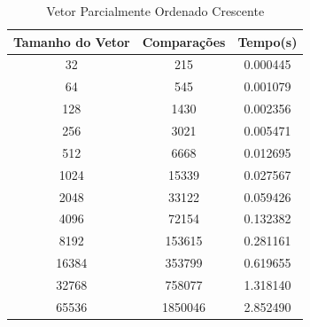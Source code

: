 \documentclass[12pt,a4paper,twoside]{report}
\begin{document}
\begin{table}[h]
  \centering
  \caption{Vetor Parcialmente Ordenado Crescente \label{tab:poc}}
  \begin{tabular}{ccc} \\\hline
  \textbf{Tamanho do Vetor} & \textbf{Comparações} & \textbf{Tempo(s)} \\\hline
  32                        & 215                  & 0.000445          \\\hline
  64                        & 545                 & 0.001079          \\\hline
  128                       & 1430                 & 0.002356          \\\hline
  256                       & 3021                & 0.005471          \\\hline
  512                       & 6668               & 0.012695          \\\hline
  1024                      & 15339               & 0.027567          \\\hline
  2048                      & 33122              & 0.059426          \\\hline
  4096                      & 72154              & 0.132382        \\\hline
  8192                      & 153615             & 0.281161			\\\hline
  16384                     & 353799            & 0.619655        \\\hline
  32768                     & 758077            & 1.318140        \\\hline
  65536                     & 1850046            & 2.852490        \\\hline
  \end{tabular}
\end{table}
\end{document}
